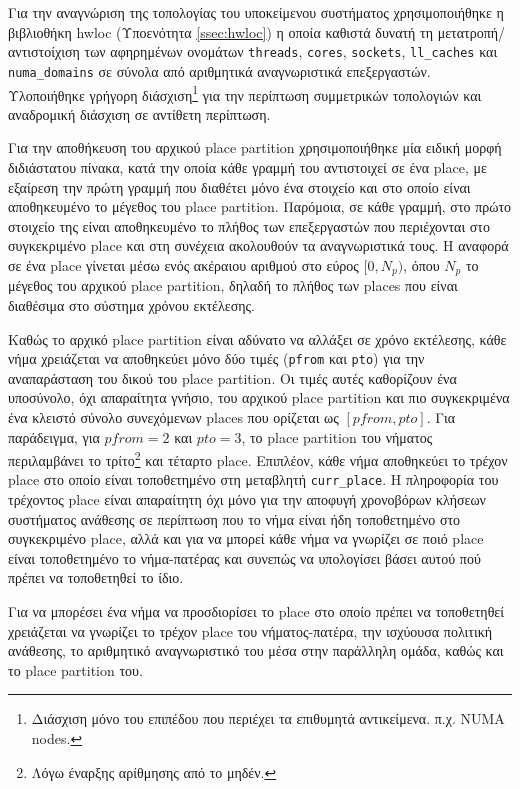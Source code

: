 Για την αναγνώριση της τοπολογίας του υποκείμενου συστήματος χρησιμοποιήθηκε η βιβλιοθήκη hwloc (Υποενότητα \ref{ssec:hwloc}) η οποία καθιστά δυνατή τη μετατροπή/αντιστοίχιση των αφηρημένων ονομάτων \texttt{threads}, \texttt{cores}, \texttt{sockets}, \texttt{ll\_caches} και \texttt{numa\_domains} σε σύνολα  από αριθμητικά αναγνωριστικά επεξεργαστών. Υλοποιήθηκε γρήγορη διάσχιση\footnote{Διάσχιση μόνο του επιπέδου που περιέχει τα επιθυμητά αντικείμενα. π.χ. NUMA nodes.} για την περίπτωση συμμετρικών τοπολογιών και αναδρομική διάσχιση σε αντίθετη περίπτωση.

Για την αποθήκευση του αρχικού place partition χρησιμοποιήθηκε μία ειδική μορφή διδιάστατου πίνακα, κατά την οποία κάθε γραμμή του αντιστοιχεί σε ένα place, με εξαίρεση την πρώτη γραμμή που διαθέτει μόνο ένα στοιχείο και στο οποίο είναι αποθηκευμένο το μέγεθος του place partition. Παρόμοια, σε κάθε γραμμή, στο πρώτο στοιχείο της είναι αποθηκευμένο το πλήθος των επεξεργαστών που περιέχονται στο συγκεκριμένο place και στη συνέχεια ακολουθούν τα αναγνωριστικά τους. Η αναφορά σε ένα place γίνεται μέσω ενός ακέραιου αριθμού στο εύρος $[0,N_p)$, όπου $N_p$ το μέγεθος του αρχικού place partition, δηλαδή το πλήθος των places που είναι διαθέσιμα στο σύστημα χρόνου εκτέλεσης.

Καθώς το αρχικό place partition είναι αδύνατο να αλλάξει σε χρόνο εκτέλεσης, κάθε νήμα χρειάζεται να αποθηκεύει μόνο δύο τιμές (\texttt{pfrom} και \texttt{pto}) για την αναπαράσταση του δικού του place partition. Οι τιμές αυτές καθορίζουν ένα υποσύνολο, όχι απαραίτητα γνήσιο, του αρχικού place partition και πιο συγκεκριμένα ένα κλειστό σύνολο συνεχόμενων places που ορίζεται ως $[pfrom, pto]$. Για παράδειγμα, για $pfrom = 2$ και $pto = 3$, το place partition του νήματος περιλαμβάνει το τρίτο\footnote{Λόγω έναρξης αρίθμησης από το μηδέν.} και τέταρτο place. Επιπλέον, κάθε νήμα αποθηκεύει το τρέχον place στο οποίο είναι τοποθετημένο στη μεταβλητή \texttt{curr\_place}. Η πληροφορία του τρέχοντος place είναι απαραίτητη όχι μόνο για την αποφυγή χρονοβόρων κλήσεων συστήματος ανάθεσης σε περίπτωση που το νήμα είναι ήδη τοποθετημένο στο συγκεκριμένο place, αλλά και για να μπορεί κάθε νήμα να γνωρίζει σε ποιό place είναι τοποθετημένο το νήμα-πατέρας και συνεπώς να υπολογίσει βάσει αυτού πού πρέπει να τοποθετηθεί το ίδιο.

Για να μπορέσει ένα νήμα να προσδιορίσει το place στο οποίο πρέπει να τοποθετηθεί χρειάζεται να γνωρίζει το τρέχον place του νήματος-πατέρα, την ισχύουσα πολιτική ανάθεσης, το αριθμητικό αναγνωριστικό του μέσα στην παράλληλη ομάδα, καθώς και το place partition του.

